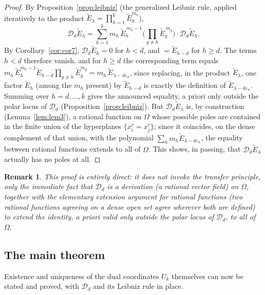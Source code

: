 \documentclass[10pt,a4paper]{amsart}
\newtheorem{remark}[theorem]{Remark}
\begin{document}
\begin{proof}
By Proposition~\ref{prop:leibniz} (the generalized Leibniz rule, applied iteratively to the product $\widetilde E_\lambda=\prod_{h=1}^k\widetilde E_h^{m_h}$),
\[
\mathcal D_d\widetilde E_\lambda = \sum_{h=1}^{k} m_h\,\widetilde E_h^{\,m_h-1}\Big(\prod_{g\ne h}\widetilde E_g^{\,m_g}\Big)\cdot \mathcal D_d\widetilde E_h.
\]
By Corollary~\ref{cor:cor7}, $\mathcal D_d\widetilde E_h=0$ for $h<d$, and $=\widetilde E_{h-d}$ for $h\ge d$. The terms $h<d$ therefore vanish, and for $h\ge d$ the corresponding term equals $m_h\,\widetilde E_h^{m_h-1}\widetilde E_{h-d}\prod_{g\ne h}\widetilde E_g^{m_g} = m_h\,\widetilde E_{\lambda-d\varepsilon_h}$, since replacing, in the product $\widetilde E_\lambda$, one factor $\widetilde E_h$ (among the $m_h$ present) by $\widetilde E_{h-d}$ is exactly the definition of $\widetilde E_{\lambda - d\varepsilon_h}$. Summing over $h=d,\dots,k$ gives the announced equality, a priori only outside the polar locus of $\mathcal D_d$ (Proposition~\ref{prop:leibniz}). But $\mathcal D_d\widetilde E_\lambda$ is, by construction (Lemma~\ref{lem:lem3}), a rational function on $\Omega$ whose possible poles are contained in the finite union of the hyperplanes $\{x_i^r=x_j^r\}$; since it coincides, on the dense complement of that union, with the polynomial $\sum_hm_h\widetilde E_{\lambda-d\varepsilon_h}$, the equality between rational functions extends to all of $\Omega$. This shows, in passing, that $\mathcal D_d\widetilde E_\lambda$ actually has no poles at all.
\end{proof}

\begin{remark}
This proof is entirely direct: it does not invoke the transfer principle, only the immediate fact that $\mathcal D_d$ is a derivation (a rational vector field) on $\Omega$, together with the elementary extension argument for rational functions (two rational functions agreeing on a dense open set agree wherever both are defined) to extend the identity, a priori valid only outside the polar locus of $\mathcal D_d$, to all of $\Omega$.
\end{remark}

\subsection{The main theorem}

Existence and uniqueness of the dual coordinates $U_k$ themselves can now be stated and proved, with $\mathcal D_d$ and its Leibniz rule in place.
\end{document}
